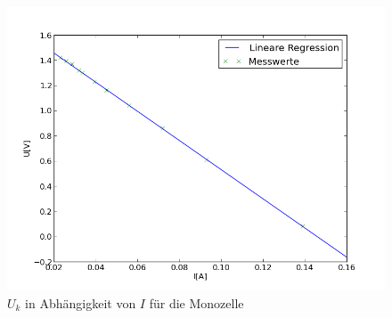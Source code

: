 \documentclass[11pt,ngerman,a4paper]{article}
\begin{document}
\begin{figure}
\centering
\includegraphics[scale=1.00]{Plot1.png}
\caption{$U_k$ in Abh\"angigkeit von $I$ f\"ur die Monozelle}
\label{Plot1}
\end{figure}
\end{document}
